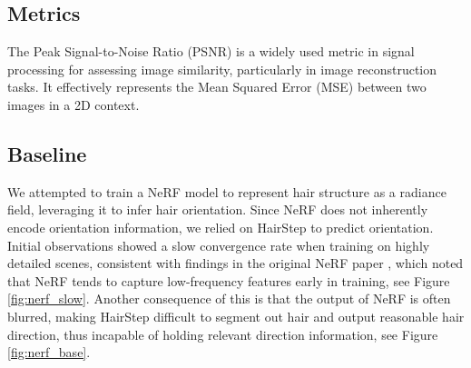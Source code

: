 \documentclass[12pt]{article}
\begin{document}
  \subsection{Metrics}

  The Peak Signal-to-Noise Ratio (PSNR) is a widely used metric in signal processing for assessing image similarity, particularly in image reconstruction tasks. It effectively represents the Mean Squared Error (MSE) between two images in a 2D context.

  \subsection{Baseline}

  We attempted to train a NeRF model to represent hair structure as a radiance field, leveraging it to infer hair orientation. Since NeRF does not inherently encode orientation information, we relied on HairStep to predict orientation. Initial observations showed a slow convergence rate when training on highly detailed scenes, consistent with findings in the original NeRF paper \cite{mildenhall_nerf_2020}, which noted that NeRF tends to capture low-frequency features early in training, see Figure \ref{fig:nerf_slow}. Another consequence of this is that the output of NeRF is often blurred, making HairStep difficult to segment out hair and output reasonable hair direction, thus incapable of holding relevant direction information, see Figure \ref{fig:nerf_base}.
\end{document}
